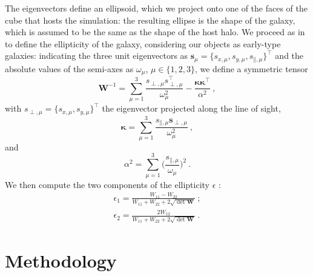 \documentclass[a4paper,fleqn,usenatbib]{mnras}
\begin{document}
The eigenvectors define an ellipsoid, which we project onto one of the faces of the cube that hosts the simulation: the resulting ellipse is the shape of the galaxy, which is assumed to be the same as the shape of the host halo. We proceed as in \citet{Joachimietal2013a, Joachimietal2013b} to define the ellipticity of the galaxy, considering our objects as early-type galaxies: indicating the three unit eigenvectors as $\mathbf{s}_{\mu} = \big \{ s_{x, \mu}, s_{y, \mu}, s_{\mathbin{\|}, \mu}\big \}^\intercal$ and the absolute values of the semi-axes as $\omega_{\mu}$, $\mu \in \{1,2,3\}$, we define a symmetric tensor
\begin{equation}
    \mathbf{W}^{-1} = \sum _{\mu=1}^{3} \frac{s_{\perp, \mu} s^\intercal_{\perp, \mu}}{\omega_{\mu}^2} - \frac{\mathbf{\kappa}\mathbf{\kappa}^{\intercal}}{\alpha^2} \ ,
	\label{eq:symtensor}
\end{equation}
with $s_{\perp, \mu} = \big \{ s_{x, \mu}, s_{y, \mu}\big \}^\intercal$ the eigenvector projected along the line of sight, 
\begin{equation}
   \mathbf{\kappa} = \sum_{\mu = 1}^{3} \frac{s_{\mathbin{\|}, \mu} \mathbf{s}_{\perp, \mu}}{\omega_{\mu}^2} \ ,
	\label{eq:kappa}
\end{equation}
and 
\begin{equation}
    \alpha^2=\sum_{\mu = 1}^{3} \bigg( \frac{s_{\mathbin{\|}, \mu}}{\omega_{\mu}} \bigg)^2 \ .
	\label{eq:alpha}
\end{equation}
We then compute the two components of the ellipticity $\epsilon$ \citep{BartelmannSchneider2001}:
\begin{align}
    	\epsilon_{1} = \frac{W_{11} - W_{22}}{W_{11} + W_{22}+2\sqrt{\det \mathbf{W}}}\ ; \\ 
           \epsilon_{2} = \frac{2 W_{12}}{W_{11} + W_{22}+2\sqrt{\det \mathbf{W}}} \ .
\end{align}

\section{Methodology}
\label{sec:method}
\end{document}

